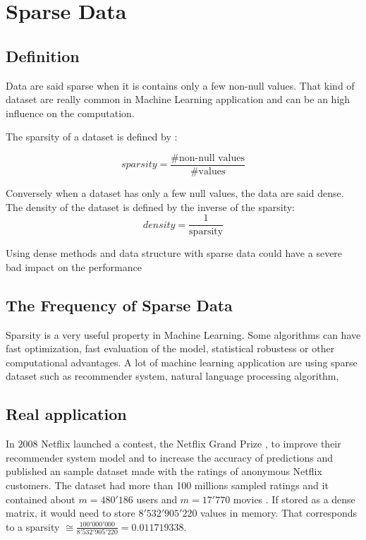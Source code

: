 \chapter{Sparse Data}
\section{Definition}

Data are said sparse when it is contains only a few non-null values. That kind of dataset are really common in Machine Learning application and can be an high influence on the computation. 

The sparsity of a dataset is defined by :

\begin{equation}\label{eqn:sparsity}
sparsity = \frac{\text{\# non-null values}}{\text{\# values}}
\end{equation}

Conversely when a dataset has only a few null values, the data are said dense. The density of the dataset is defined by the inverse of the sparsity:
\begin{equation}\label{eqn:density}
density = \frac{1}{\text{sparsity}}
\end{equation}

Using dense methods and data structure with sparse data could have a severe bad impact on the performance
\section{The Frequency of Sparse Data}
Sparsity is a very useful property in Machine Learning. Some algorithms can have fast optimization, fast evaluation of the model, statistical robustess or other computational advantages.
A lot of machine learning application are using sparse dataset such as recommender system, natural language processing algorithm, 


\section{Real application}
In 2008 Netflix launched a contest, the Netflix Grand Prize \cite{netflixgrandprize}, to improve their recommender system model and to increase the accuracy of predictions and published an sample dataset made with the ratings of anonymous Netflix customers. The dataset had more than 100 millions sampled ratings and it contained about $m=480'186$ users and $m=17'770$ movies \cite{Koren091the}. If stored as a dense matrix, it would need to store $8'532'905'220$ values in memory. That corresponds to a sparsity $\cong \frac{100'000'000}{8'532'905'220} = 0.011719338$.

